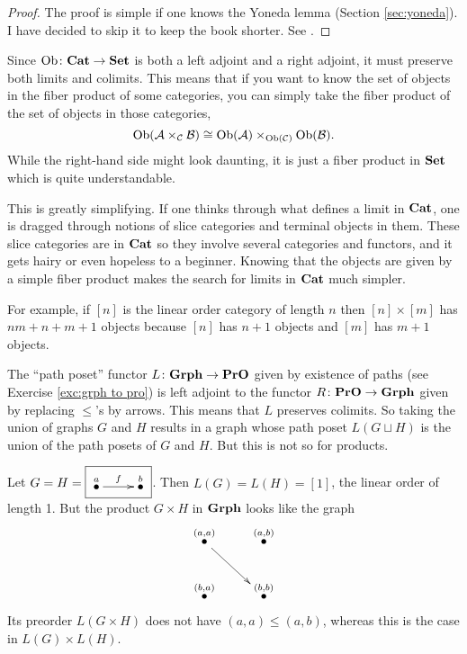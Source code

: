 \documentclass[CT4S-EN-RU]{subfiles}
\begin{document}
\begin{proof}

The proof is simple if one knows the Yoneda lemma (Section \ref{sec:yoneda}). I have decided to skip it to keep the book shorter. See \cite{Mac}.

\end{proof}

\begin{example}

Since $\textnormal{Ob}\colon{\bf Cat}\rightarrow{\bf Set}$ is both a left adjoint and a right adjoint, it must preserve both limits and colimits. This means that if you want to know the set of objects in the fiber product of some categories, you can simply take the fiber product of the set of objects in those categories, $$\textnormal{Ob}(\mathcal{A}\times_\mathcal{C}\mathcal{B})\cong\textnormal{Ob}(\mathcal{A})\times_{\textnormal{Ob}(\mathcal{C})}\textnormal{Ob}(\mathcal{B}).$$ While the right-hand side might look daunting, it is just a fiber product in ${\bf Set}$ which is quite understandable.

This is greatly simplifying. If one thinks through what defines a limit in ${\bf Cat}$, one is dragged through notions of slice categories and terminal objects in them. These slice categories are in ${\bf Cat}$ so they involve several categories and functors, and it gets hairy or even hopeless to a beginner. Knowing that the objects are given by a simple fiber product makes the search for limits in ${\bf Cat}$ much simpler. 

For example, if $[n]$ is the linear order category of length $n$ then $[n]\times[m]$ has $nm+n+m+1$ objects because $[n]$ has $n+1$ objects and $[m]$ has $m+1$ objects. 

\end{example}

\begin{example}

The “path poset” functor $L\colon{\bf Grph}\rightarrow{\bf PrO}$ given by existence of paths (see Exercise \ref{exc:grph to pro}) is left adjoint to the functor $R\colon{\bf PrO}\rightarrow{\bf Grph}$ given by replacing $\leq$'s by arrows. This means that $L$ preserves colimits. So taking the union of graphs $G$ and $H$ results in a graph whose path poset  $L(G\sqcup H)$ is the union of the path posets of $G$ and $H$. But this is not so for products. 

Let $G=H=\fbox{\xymatrix{\LMO{a}\ar[r]^f&\LMO{b}}}$. Then $L(G)=L(H)=[1]$, the linear order of length 1. But the product $G\times H$ in ${\bf Grph}$ looks like the graph 
$$\xymatrix{\LMO{(a,a)}\ar[rd]&\LMO{(a,b)}\\\LMO{(b,a)}&\LMO{(b,b)}}$$
Its preorder $L(G\times H)$ does not have $(a,a)\leq(a,b)$, whereas this is the case in $L(G)\times L(H)$.

\end{example}
\end{document}
